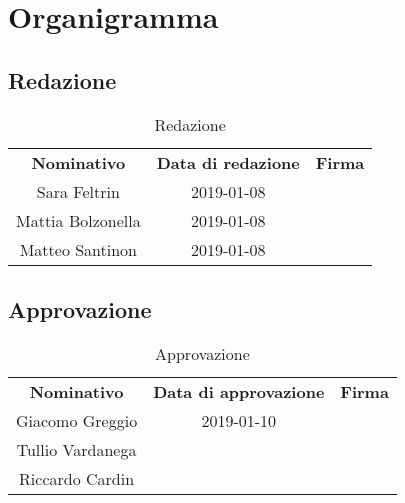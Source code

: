 \section{Organigramma}

\subsection{Redazione}
\begin{table}[H]
	\centering\renewcommand{\arraystretch}{1.5}
    \begin{tabular}{c|c|c}
		\hline
		
		\rowcolorhead 
		{ \textbf{Nominativo}} &
		{ \textbf{Data di redazione}} &
		{ \textbf{Firma}}  \\ 
		
		\rowcolorlight
		Sara Feltrin & 2019-01-08 &   \\ 
		\rowcolordark
		Mattia Bolzonella & 2019-01-08 &   \\ 
		\rowcolorlight
		Matteo Santinon & 2019-01-08 &   \\ 
	\end{tabular}
	\caption{Redazione}
\end{table}

\subsection{Approvazione}
\begin{table}[H]
	\centering\renewcommand{\arraystretch}{1.5}
	\begin{tabular}{c|c|c}
		\hline
		
		\rowcolorhead 
		{ \textbf{Nominativo}} &
		{ \textbf{Data di approvazione}} &
		{ \textbf{Firma}}  \\
		
		\rowcolorlight
		Giacomo Greggio & 2019-01-10 &   \\ 
		\rowcolordark
		Tullio Vardanega &  &   \\ 
		\rowcolorlight
		Riccardo Cardin &  &   \\ 
	\end{tabular}
	\caption{Approvazione}
\end{table}

